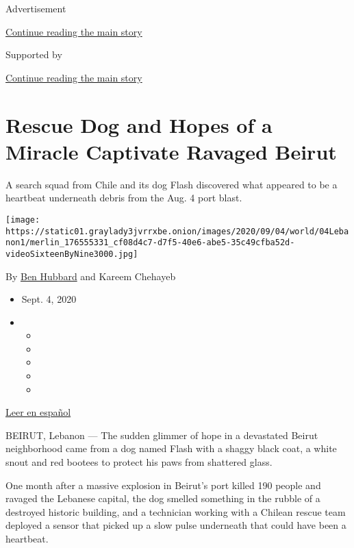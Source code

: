 Advertisement

\protect\hyperlink{after-top}{Continue reading the main story}

Supported by

\protect\hyperlink{after-sponsor}{Continue reading the main story}

\hypertarget{rescue-dog-and-hopes-of-a-miracle-captivate-ravaged-beirut}{%
\section{Rescue Dog and Hopes of a Miracle Captivate Ravaged
Beirut}\label{rescue-dog-and-hopes-of-a-miracle-captivate-ravaged-beirut}}

A search squad from Chile and its dog Flash discovered what appeared to
be a heartbeat underneath debris from the Aug. 4 port blast.

\texttt{[image: https://static01.graylady3jvrrxbe.onion/images/2020/09/04/world/04Lebanon1/merlin\_176555331\_cf08d4c7-d7f5-40e6-abe5-35c49cfba52d-videoSixteenByNine3000.jpg]}

By \href{https://www.nytimes3xbfgragh.onion/by/ben-hubbard}{Ben Hubbard}
and Kareem Chehayeb

\begin{itemize}
\item
  Sept. 4, 2020
\item
  \begin{itemize}
  \item
  \item
  \item
  \item
  \item
  \end{itemize}
\end{itemize}

\href{https://www.nytimes3xbfgragh.onion/es/2020/09/04/espanol/mundo/libano-rescate-topos.html}{Leer
en español}

BEIRUT, Lebanon --- The sudden glimmer of hope in a devastated Beirut
neighborhood came from a dog named Flash with a shaggy black coat, a
white snout and red bootees to protect his paws from shattered glass.

One month after a massive explosion in Beirut's port killed 190 people
and ravaged the Lebanese capital, the dog smelled something in the
rubble of a destroyed historic building, and a technician working with a
Chilean rescue team deployed a sensor that picked up a slow pulse
underneath that could have been a heartbeat.

